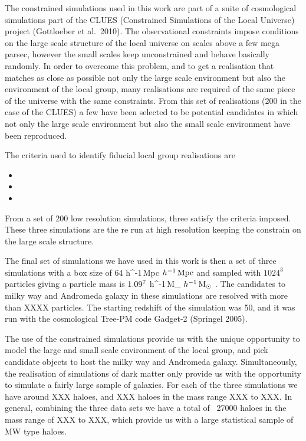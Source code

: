 \documentclass[useAMS,usenatbib]{mn2e}
\newcommand{\etal}{et al.~}
\def \hMsun {\ifmmode h^{-1}\,\rm M_{\odot} \else $h^{-1}\,\rm M_{\odot}$ \fi}
\def \hMpc {\ifmmode h^{-1}\,\rm Mpc \else $h^{-1}\,\rm Mpc$ \fi}
\begin{document}
The constrained simulations used in this work are part of a suite of
cosmological simulations part of the CLUES (Constrained Simulations of
the Local Universe) project (Gottloeber \etal 2010). The observational
constraints impose conditions on the large scale structure of the local
universe on scales above a few mega parsec, however the small scales
keep unconstrained and behave basically randomly. In order to overcome
this problem, and to get a realisation that matches as close as
possible not only the large scale environment but also the environment
of the local group, many realisations are required of the same piece
of the universe with the same constraints. From this set of
realisations (200 in the case of the CLUES) a few have been selected
to be potential candidates in which not only the large scale
environment but also the small scale environment have been reproduced.

The criteria used to identify fiducial local group realisations are

\begin{itemize}
\item
\item
\item
\end{itemize}

From a set of 200 low resolution simulations, three satisfy the
criteria imposed. These three simulations are the re run at high
resolution keeping the constrain on the large scale structure.

The final set of simulations we have used in this work is then a set
of three simulations with a box size of 64 \hMpc and sampled with
$1024^3$ particles giving a particle mass is $1.09\time10^7$
\hMsun. The candidates to milky way and Andromeda galaxy in these
simulations are resolved with more than XXXX particles. The starting
redshift of the simulation was 50, and it was run with the
cosmological Tree-PM code Gadget-2 (Springel 2005).

The use of the constrained simulations provide us with the unique
opportunity to model the large and small scale environment of the local
group, and pick candidate objects to host the milky way and Andromeda
galaxy. Simultaneously, the realisation of simulations of dark matter
only provide us with the opportunity to simulate a fairly large sample
of galaxies. For each of the three simulations we have around XXX
haloes, and XXX haloes in the mass range XXX to XXX. In general,
combining the three data sets we have a total of ~27000 haloes in the
mass range of XXX to XXX, which provide us with a large statistical
sample of MW type haloes.
\end{document}
